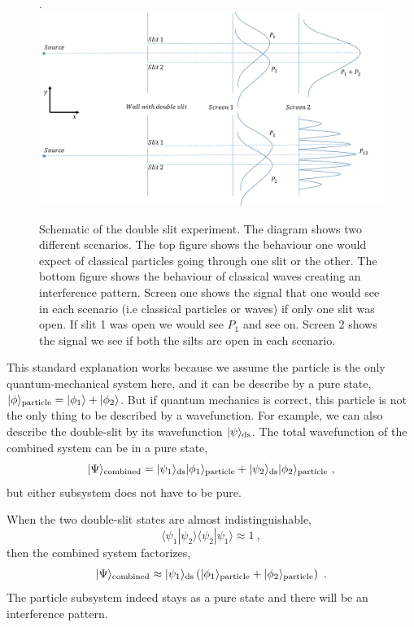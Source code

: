 \documentclass[aps,showpacs,onecolumn,floats,prd,superscriptaddress,nofootinbib]{revtex4-1}
\begin{document}
\begin{figure}[h!]
\begin{center}.
\includegraphics[scale = 0.5]{DSe.pdf}
\caption{Schematic of the double slit experiment. The diagram shows two different scenarios. The top figure shows the behaviour one would expect of classical particles going through one slit or the other. The bottom figure shows the behaviour of classical waves creating an interference pattern. Screen one shows the signal that one would see in each scenario (i.e classical particles or waves) if only one slit was open. If slit 1 was open we would see $P_1$ and see on. Screen 2 shows the signal we see if both the silts are open in each scenario.}
\label{fig-doubleslit}
\end{center}
\end{figure}

This standard explanation works because we assume the particle is the only quantum-mechanical system here, and it can be describe by a pure state, $|\phi\rangle_{\rm particle} = |\phi_1\rangle + |\phi_2\rangle$.
But if quantum mechanics is correct, this particle is not the only thing to be described by a wavefunction. 
For example, we can also describe the double-slit by its wavefunction $|\psi\rangle_{\rm ds}$. The total wavefunction of the combined system can be in a pure state,
\begin{equation}
|\Psi\rangle_{\rm combined} = |\psi_1\rangle_{\rm ds}|\phi_1\rangle_{\rm particle} 
+ |\psi_2\rangle_{\rm ds}|\phi_2\rangle_{\rm particle} ~,
\end{equation}
but either subsystem does not have to be pure.

When the two double-slit states are almost indistinguishable,
\begin{equation}
\langle\psi_1|\psi_2\rangle\langle\psi_2|\psi_1\rangle \approx 1~,
\label{eq-pure}
\end{equation}
then the combined system factorizes,
\begin{equation}
|\Psi\rangle_{\rm combined} \approx |\psi_1\rangle_{\rm ds}
\left(|\phi_1\rangle_{\rm particle} + |\phi_2\rangle_{\rm particle}\right) ~.
\end{equation}
The particle subsystem indeed stays as a pure state and there will be an interference pattern.
\end{document}
